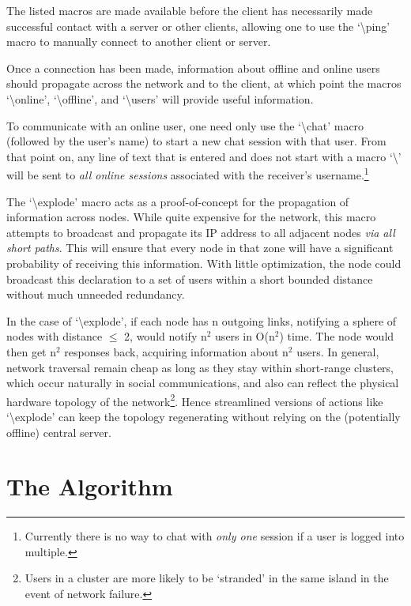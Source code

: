 \documentclass[11pt]{article}
\begin{document}
The listed macros are made available before the client has necessarily made successful contact with a server or other clients, allowing one to use the `\textbackslash ping' macro to manually connect to another client or server.

Once a connection has been made, information about offline and online users should propagate across the network and to the client, at which point the macros `\textbackslash online', `\textbackslash offline', and `\textbackslash users' will provide useful information.

To communicate with an online user, one need only use the `\textbackslash chat' macro (followed by the user's name) to start a new chat session with that user. From that point on, any line of text that is entered and does not start with a macro `\textbackslash' will be sent to \emph{all online sessions} associated with the receiver's username.\footnote{Currently there is no way to chat with \emph{only one} session if a user is logged into multiple.}

The `\textbackslash explode' macro acts as a proof-of-concept for the propagation of information across nodes. While quite expensive for the network, this macro attempts to broadcast and propagate its IP address to all adjacent nodes \emph{via all short paths}. This will ensure that every node in that zone will have a significant probability of receiving this information. With little optimization, the node could broadcast this declaration to a set of users within a short bounded distance without much unneeded redundancy. 

In the case of `\textbackslash explode', if each node has n outgoing links, notifying a sphere of nodes with distance $\leq$ 2, would notify n$^2$ users in O(n$^2$) time. The node would then get n$^2$ responses back, acquiring information about n$^2$ users. In general, network traversal remain cheap as long as they stay within short-range clusters, which occur naturally in social communications, and also can reflect the physical hardware topology of the network\footnote{Users in a cluster are more likely to be `stranded' in the same island in the event of network failure.}. Hence streamlined versions of actions like `\textbackslash explode' can keep the topology regenerating without relying on the (potentially offline) central server.

\section{The Algorithm}
\end{document}

